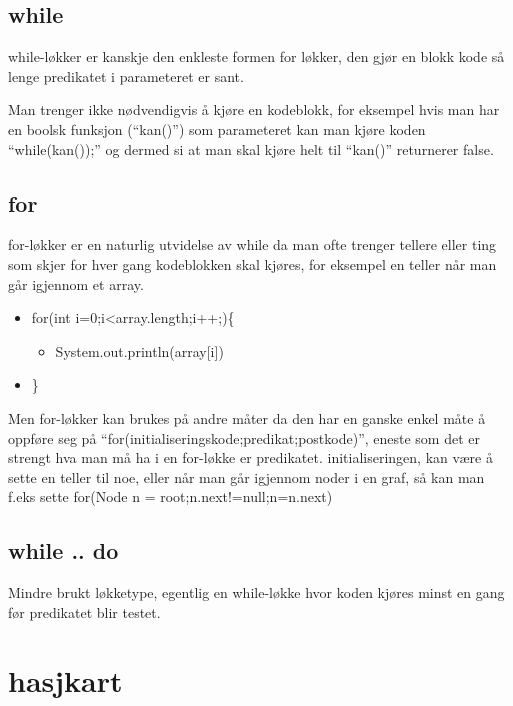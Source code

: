 \documentclass[11pt]{article}
\begin{document}
\subsection{while}
\label{sec-5_1}

   
   while-løkker er kanskje den enkleste formen for løkker, den gjør en blokk kode
   så lenge predikatet i parameteret er sant. 

   Man trenger ikke nødvendigvis å kjøre
   en kodeblokk, for eksempel hvis man har en boolsk funksjon (``kan()'') som parameteret
   kan man kjøre koden ``while(kan());'' og dermed si at man skal kjøre helt til ``kan()''
   returnerer false.
\subsection{for}
\label{sec-5_2}

   
   for-løkker er en naturlig utvidelse av while da man ofte trenger tellere eller ting
   som skjer for hver gang kodeblokken skal kjøres, for eksempel en teller når man går
   igjennom et array.

\begin{itemize}
\item for(int i=0;i<array.length;i++;)\{

\begin{itemize}
\item System.out.println(array[i])
\end{itemize}

\item \}
\end{itemize}


   Men for-løkker kan brukes på andre måter da den har en ganske enkel måte å oppføre 
   seg på ``for(initialiseringskode;predikat;postkode)'', eneste som det er strengt hva 
   man må ha i en for-løkke er predikatet. initialiseringen, kan være å sette en teller
   til noe, eller når man går igjennom noder i en graf, så kan man f.eks sette 
   for(Node n = root;n.next!=null;n=n.next)
\subsection{while .. do}
\label{sec-5_3}

   
   Mindre brukt løkketype, egentlig en while-løkke hvor koden kjøres minst en gang før
   predikatet blir testet.
  
\section{hasjkart}
\label{sec-6}
\end{document}
